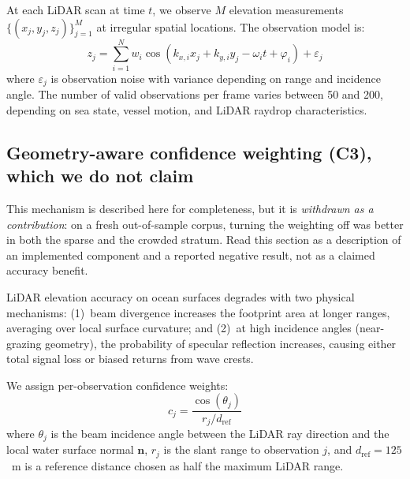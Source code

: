\documentclass[review]{elsarticle}
\begin{document}
At each LiDAR scan at time $t$, we observe $M$ elevation measurements
$\{(x_j, y_j, z_j)\}_{j=1}^{M}$ at irregular spatial locations.
The observation model is:
\begin{equation}
  z_j = \sum_{i=1}^{N} w_i \cos(k_{x,i} x_j + k_{y,i} y_j - \omega_i t + \varphi_i) + \varepsilon_j
\end{equation}
where $\varepsilon_j$ is observation noise with variance depending on range
and incidence angle.  The number of valid observations per frame
varies between 50 and 200, depending on sea state, vessel motion,
and LiDAR raydrop characteristics.

\subsection{Geometry-aware confidence weighting (C3), which we do not claim}
\label{sec:c3}

This mechanism is described here for
completeness, but it is \emph{withdrawn as a contribution}: on a fresh
out-of-sample corpus, turning the weighting off was better in both the
sparse and the crowded stratum. Read this section as a description of an
implemented component and a reported negative result, not as a claimed
accuracy benefit.

LiDAR elevation accuracy on ocean surfaces degrades with two
physical mechanisms:
(1)~beam divergence increases the footprint area at longer ranges,
averaging over local surface curvature; and
(2)~at high incidence angles (near-grazing geometry), the probability
of specular reflection increases, causing either total signal loss
or biased returns from wave crests.

We assign per-observation confidence weights:
\begin{equation}
  c_j = \frac{\cos(\theta_j)}{r_j / d_{\text{ref}}}
  \label{eq:confidence}
\end{equation}
where $\theta_j$ is the beam incidence angle between the LiDAR ray
direction and the local water surface normal $\mathbf{n}$, $r_j$ is
the slant range to observation $j$, and $d_{\text{ref}} = 125$~m is a reference distance chosen
as half the maximum LiDAR range.
\end{document}
